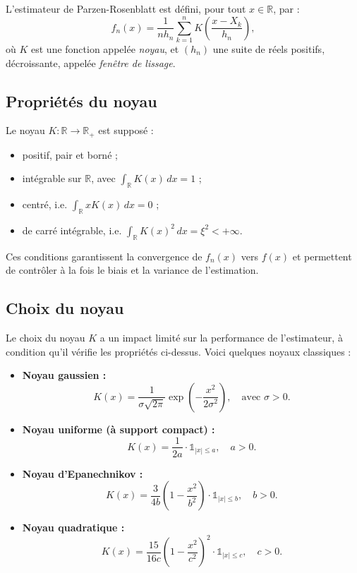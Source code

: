 \documentclass[12pt]{article}
\begin{document}
L’estimateur de Parzen-Rosenblatt est défini, pour tout \( x \in \mathbb{R} \), par :
\[
f_n(x) = \frac{1}{n h_n} \sum_{k=1}^{n} K\left( \frac{x - X_k}{h_n} \right),
\]
où \( K \) est une fonction appelée \emph{noyau}, et \( (h_n) \) une suite de réels positifs, décroissante, appelée \emph{fenêtre de lissage}.

\subsection*{Propriétés du noyau}

Le noyau \( K : \mathbb{R} \rightarrow \mathbb{R}_+ \) est supposé :
\begin{itemize}
    \item positif, pair et borné ;
    \item intégrable sur \( \mathbb{R} \), avec \( \int_{\mathbb{R}} K(x) \, dx = 1 \) ;
    \item centré, i.e. \( \int_{\mathbb{R}} x K(x) \, dx = 0 \) ;
    \item de carré intégrable, i.e. \( \int_{\mathbb{R}} K(x)^2 \, dx = \xi^2 < +\infty \).
\\

\end{itemize}


Ces conditions garantissent la convergence de \( f_n(x) \) vers \( f(x) \) et permettent de contrôler à la fois le biais et la variance de l’estimation.

\subsection*{Choix du noyau}

Le choix du noyau \( K \) a un impact limité sur la performance de l’estimateur, à condition qu’il vérifie les propriétés ci-dessus. Voici quelques noyaux classiques :

\begin{itemize}
    \item \textbf{Noyau gaussien :}
    \[
    K(x) = \frac{1}{\sigma \sqrt{2\pi}} \exp\left(-\frac{x^2}{2\sigma^2}\right), \quad \text{avec } \sigma > 0.
    \]
    
    \item \textbf{Noyau uniforme (à support compact) :}
    \[
    K(x) = \frac{1}{2a} \cdot \mathbb{1}_{|x| \leq a}, \quad a > 0.
    \]
    
    \item \textbf{Noyau d’Epanechnikov :}
    \[
    K(x) = \frac{3}{4b} \left(1 - \frac{x^2}{b^2}\right) \cdot \mathbb{1}_{|x| \leq b}, \quad b > 0.
    \]
    
    \item \textbf{Noyau quadratique :}
    \[
    K(x) = \frac{15}{16c} \left(1 - \frac{x^2}{c^2} \right)^2 \cdot \mathbb{1}_{|x| \leq c}, \quad c > 0.
    \]
\end{itemize}
\end{document}
